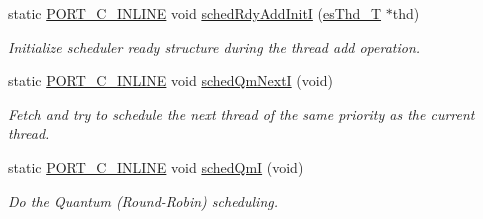 \begin{DoxyCompactItemize}
static \hyperlink{group__template__compiler_ga87952d6e574c7f437503926e833ba345}{P\-O\-R\-T\-\_\-\-C\-\_\-\-I\-N\-L\-I\-N\-E} void \hyperlink{group__kern__impl_ga1317c12a1355ee8db4f104338f1df88d}{sched\-Rdy\-Add\-Init\-I} (\hyperlink{group__kern__intf_ga62e3a3ca0a4597a19c43cb8868810d82}{es\-Thd\-\_\-\-T} $\ast$thd)
\begin{DoxyCompactList}\small\item\em Initialize scheduler ready structure during the thread add operation. \end{DoxyCompactList}\item 
static \hyperlink{group__template__compiler_ga87952d6e574c7f437503926e833ba345}{P\-O\-R\-T\-\_\-\-C\-\_\-\-I\-N\-L\-I\-N\-E} void \hyperlink{group__kern__impl_ga56290a8f51b1d3babec91602292c8d61}{sched\-Qm\-Next\-I} (void)
\begin{DoxyCompactList}\small\item\em Fetch and try to schedule the next thread of the same priority as the current thread. \end{DoxyCompactList}\item 
static \hyperlink{group__template__compiler_ga87952d6e574c7f437503926e833ba345}{P\-O\-R\-T\-\_\-\-C\-\_\-\-I\-N\-L\-I\-N\-E} void \hyperlink{group__kern__impl_gaf57b17dda8d71ce9e7ef57ea0e7ef534}{sched\-Qm\-I} (void)
\begin{DoxyCompactList}\small\item\em Do the Quantum (Round-\/\-Robin) scheduling. \end{DoxyCompactList}\end{DoxyCompactItemize}
